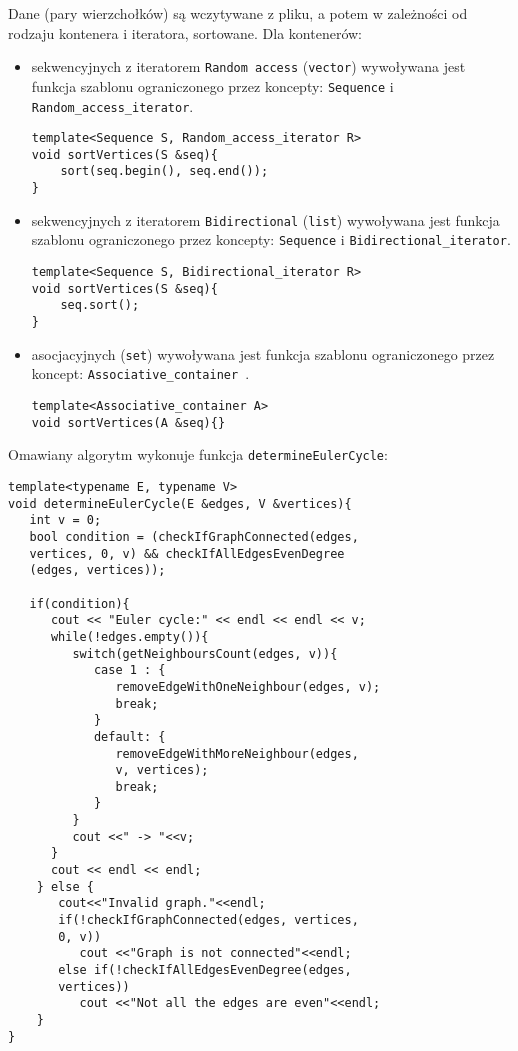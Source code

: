 \documentclass[11pt, a4paper]{article}
\begin{document}
Dane (pary wierzchołków) są wczytywane z pliku, a potem w zależności od rodzaju kontenera i iteratora, sortowane. Dla kontenerów: 
\begin{itemize}
\item sekwencyjnych z iteratorem \verb#Random access# (\verb#vector#) wywoływana jest funkcja szablonu ograniczonego przez koncepty: \verb#Sequence# i \newline \verb#Random_access_iterator#.

\begin{lstlisting}[frame=single]
template<Sequence S, Random_access_iterator R>
void sortVertices(S &seq){
    sort(seq.begin(), seq.end());
}
\end{lstlisting}

\item sekwencyjnych z iteratorem \verb#Bidirectional# (\verb#list#) wywoływana jest funkcja szablonu ograniczonego przez koncepty: \verb#Sequence# i \newline \verb#Bidirectional_iterator#.

\begin{lstlisting}[frame=single]
template<Sequence S, Bidirectional_iterator R>
void sortVertices(S &seq){
    seq.sort();
}
\end{lstlisting}

\item asocjacyjnych (\verb#set#) wywoływana jest funkcja szablonu ograniczonego przez koncept: \verb#Associative_container #.

\begin{lstlisting}[frame=single]
template<Associative_container A>
void sortVertices(A &seq){}
\end{lstlisting}

\end{itemize}
\newpage
Omawiany algorytm wykonuje funkcja \verb#determineEulerCycle#:
\begin{lstlisting}[frame=single]
template<typename E, typename V>
void determineEulerCycle(E &edges, V &vertices){
   int v = 0;
   bool condition = (checkIfGraphConnected(edges, 
   vertices, 0, v) && checkIfAllEdgesEvenDegree
   (edges, vertices));
    
   if(condition){
      cout << "Euler cycle:" << endl << endl << v;
      while(!edges.empty()){
         switch(getNeighboursCount(edges, v)){
            case 1 : {
               removeEdgeWithOneNeighbour(edges, v);
               break;
            }
            default: {
               removeEdgeWithMoreNeighbour(edges,
               v, vertices);
               break;
            }
         }
         cout <<" -> "<<v;
      }
      cout << endl << endl;
    } else {
       cout<<"Invalid graph."<<endl;
       if(!checkIfGraphConnected(edges, vertices,
       0, v))
          cout <<"Graph is not connected"<<endl;
       else if(!checkIfAllEdgesEvenDegree(edges,
       vertices))
          cout <<"Not all the edges are even"<<endl;
    }
}
\end{lstlisting}
\end{document}
